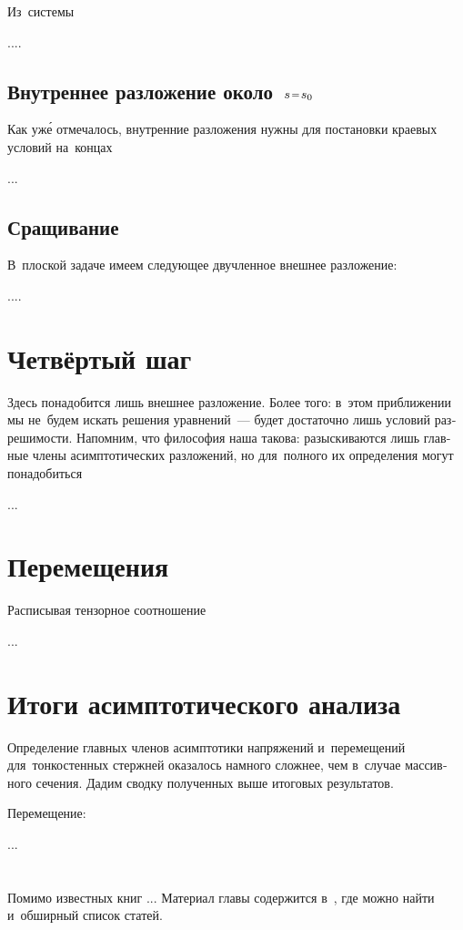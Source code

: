 \begin{otherlanguage}{russian}
Из~системы

....

\subsection*{Внутреннее разложение около~${s \narroweq s_0}$}

Как уж\'{е} отмечалось, внутренние разложения нужны для постановки краевых условий на~концах

...

\subsection*{Сращивание}

В~плоской задаче имеем следующее двучленное внешнее разложение:

....



\section{Четвёртый шаг}

Здесь понадобится лишь внешнее разложение. Более того: в~этом приближении мы не~будем искать решения уравнений~--- будет достаточно лишь условий разрешимости. Напомним, что философия наша такова: разыскиваются лишь главные члены асимптотических разложений, но для~полного их определения могут понадобиться

...



\section{Перемещения}

Расписывая тензорное соотношение

...



\section{Итоги асимптотического анализа}

Определение главных членов асимптотики напряжений и~перемещений для~тонкостенных стержней оказалось намного сложнее, чем в~случае массивного сечения. Дадим сводку полученных выше итоговых результатов.

Перемещение:

...





\vspace{8mm}
\hfill\begin{minipage}[b]{0.95\linewidth}
\fontsize{10}{12}\selectfont

\section*{\wordforbibliography}

Помимо известных книг ... Материал главы содержится в~\cite{eliseev-models}, где можно найти и~обширный список статей.

\end{minipage}

\end{otherlanguage}

